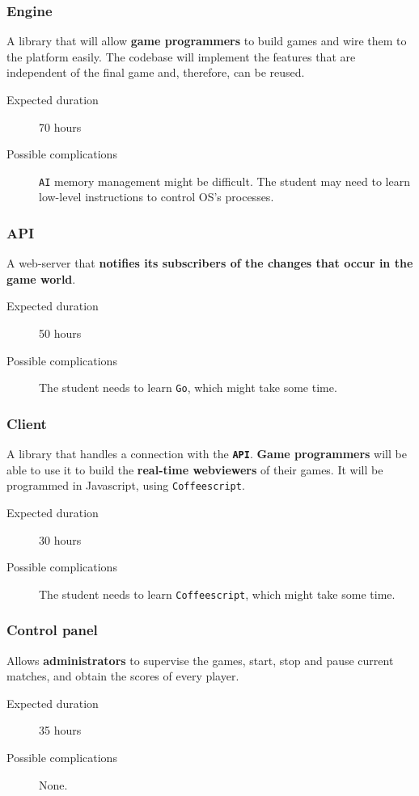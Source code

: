 \documentclass[a4paper,11pt,titlepage,abstract,numbers=noenddot,automark,mnsy,intlimits,rgb,dvipsnames]{report}
\begin{document}
\subsubsection{Engine}
A library that will allow \textbf{game programmers} to build games and wire them to the platform
easily. The codebase will implement the features that are independent of the final game and, therefore, can be reused.
\begin{description}
\item[Expected duration]
70 hours
\item[Possible complications]
\texttt{AI} memory management might be difficult.
  The student may need to learn low-level instructions to control OS's processes.
\end{description}
\subsubsection{API}
A web-server that \textbf{notifies its subscribers of the changes that occur in the game world}.
\begin{description}
\item[Expected duration]
50 hours
\item[Possible complications]
The student needs to learn \texttt{Go}, which might take some time.
\end{description}
\subsubsection{Client}
A library that handles a connection with the \textbf{\texttt{API}}. \textbf{Game programmers} will be able to use it to build
the \textbf{real-time webviewers} of their games. It will be programmed in \texttt{}Javascript\texttt{}, using \texttt{Coffeescript}.
\begin{description}
\item[Expected duration]
30 hours
\item[Possible complications]
The student needs to learn \texttt{Coffeescript}, which might take some time.
\end{description}
\subsubsection{Control panel}
Allows \textbf{administrators} to supervise the games, start, stop and pause current matches, and obtain the
scores of every player.
\begin{description}
\item[Expected duration]
35 hours
\item[Possible complications]
None.
\end{description}
\end{document}
